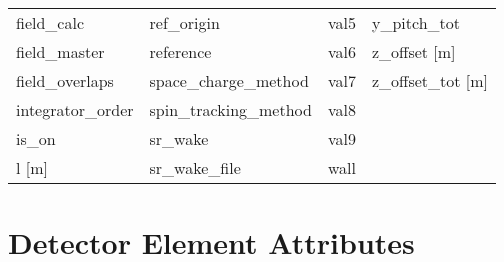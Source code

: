 \begin{tabular}{llll}
field_calc                       & ref_origin                       & val5                             & y_pitch_tot                      \\
field_master                     & reference                        & val6                             & z_offset [m]                     \\
field_overlaps                   & space_charge_method              & val7                             & z_offset_tot [m]                 \\
integrator_order                 & spin_tracking_method             & val8                             &                                  \\
is_on                            & sr_wake                          & val9                             &                                  \\
l [m]                            & sr_wake_file                     & wall                             &                                  \\
 \bottomrule
 \end{tabular}
 \vfill
 
 \section{Detector Element Attributes}
 \label{s:list.detector}
 
